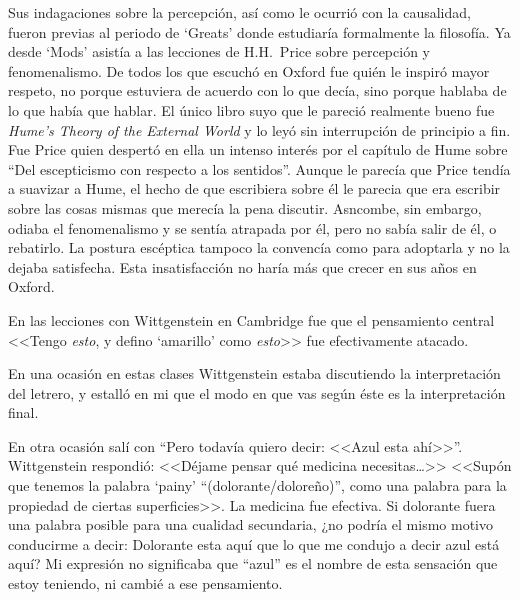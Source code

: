 Sus indagaciones sobre la percepción, así como le ocurrió con la causalidad,
fueron previas al periodo de `Greats' donde estudiaría formalmente la filosofía.
Ya desde `Mods' asistía a las lecciones de H.H.~Price sobre percepción y
fenomenalismo. De todos los que escuchó en Oxford fue quién le inspiró mayor
respeto, no porque estuviera de acuerdo con lo que decía, sino porque hablaba de
lo que había que hablar. El único libro suyo que le pareció realmente bueno fue
\emph{Hume's Theory of the External World} y lo leyó sin interrupción de
principio a fin. Fue Price quien despertó en ella un intenso interés por el
capítulo de Hume sobre ``Del escepticismo con respecto a los sentidos''. Aunque
le parecía que Price tendía a suavizar a Hume, el hecho de que escribiera sobre
él le parecia que era escribir sobre las cosas mismas que merecía la pena
discutir. Asncombe, sin embargo, odiaba el fenomenalismo y se sentía atrapada
por él, pero no sabía salir de él, o rebatirlo. La postura escéptica tampoco la
convencía como para adoptarla y no la dejaba satisfecha. Esta insatisfacción no
haría más que crecer en sus años en Oxford.
\autocites[cf.~][p.~viii]{anscombe1981metaphysicsintro}
[~y~][p.~26]{torralba2005accion}


 En las lecciones con Wittgenstein en Cambridge fue que el pensamiento central
 <<Tengo \emph{esto}, y defino `amarillo' como \emph{esto}>> fue efectivamente
 atacado.

 En una ocasión en estas clases Wittgenstein estaba discutiendo la interpretación
 del letrero\autocite[p.~86~\S198]{PI}, y estalló en mi que el modo en que vas
 según éste es la interpretación final.

 En otra ocasión salí con ``Pero todavía quiero decir: <<Azul esta ahí>>''.
 Wittgenstein respondió: <<Déjame pensar qué medicina necesitas\ldots>> <<Supón
 que tenemos la palabra `painy' ``(dolorante/doloreño)'', como una palabra para
 la propiedad de ciertas superficies>>. La medicina fue efectiva. Si dolorante
 fuera una palabra posible para una cualidad secundaria, ¿no podría el mismo
 motivo conducirme a decir: Dolorante esta aquí que lo que me condujo a decir
 azul está aquí? Mi expresión no significaba que ``azul'' es el nombre de esta
 sensación que estoy teniendo, ni cambié a ese pensamiento.

